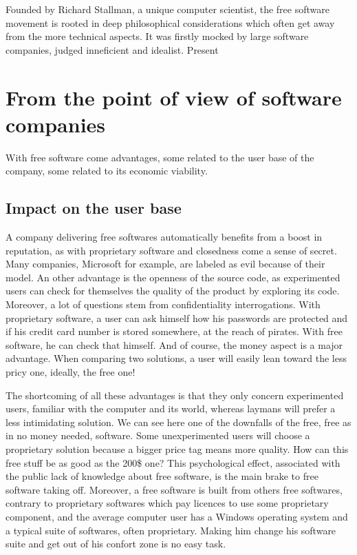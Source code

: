 \documentclass[12pt]{article}
\begin{document}
Founded by Richard Stallman, a unique computer scientist, the free
software movement is rooted in deep philosophical considerations which
often get away from the more technical aspects. It was firstly mocked
by large software companies, judged inneficient and idealist. Present

\section{From the point of view of software companies}

With free software come advantages, some related to the user base of
the company, some related to its economic viability.

\subsection{Impact on the user base}

A company delivering free softwares automatically benefits from a
boost in reputation, as with proprietary software and closedness come
a sense of secret. Many companies, Microsoft for example, are labeled
as evil because of their model. An other advantage is the openness of
the source code, as experimented users can check for themselves the
quality of the product by exploring its code. Moreover, a lot of
questions stem from confidentiality interrogations. With proprietary
software, a user can ask himself how his passwords are protected and
if his credit card number is stored somewhere, at the reach of
pirates. With free software, he can check that himself. And of course,
the money aspect is a major advantage. When comparing two solutions, a
user will easily lean toward the less pricy one, ideally, the free
one!

The shortcoming of all these advantages is that they only concern
experimented users, familiar with the computer and its world, whereas
laymans will prefer a less intimidating solution. We can see here one
of the downfalls of the free, free as in no money needed,
software. Some unexperimented users will choose a proprietary solution
because a bigger price tag means more quality. How can this free
stuff be as good as the 200\$ one? This psychological effect,
associated with the public lack of knowledge about free software, is
the main brake to free software taking off. Moreover, a free software
is built from others free softwares, contrary to proprietary softwares
which pay licences to use some proprietary component, and the average
computer user has a Windows operating system and a typical suite of
softwares, often proprietary. Making him change his software suite and
get out of his confort zone is no easy task.
\end{document}
